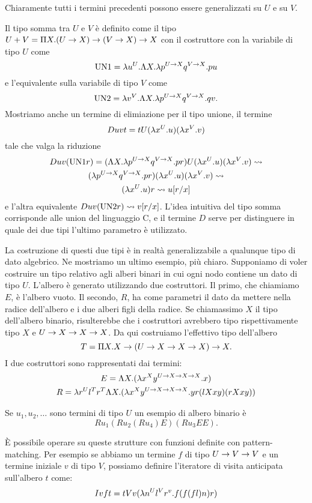 \documentclass[]{marticle}
\begin{document}
Chiaramente tutti i termini precedenti possono essere generalizzati su $U$ e su
$V$.

Il tipo somma tra $U$ e $V$ \`e definito come il tipo $U+V = \Pi X. (U\rightarrow X)
\rightarrow (V\rightarrow X) \rightarrow X$ con il costruttore con la variabile di tipo $U$ come 
\[
    \text{UN1} = \lambda u^U. \Lambda X. \lambda p^{U\rightarrow X} q^{V\rightarrow X}. pu
\]
e l'equivalente sulla variabile di tipo $V$ come 
\[
    \text{UN2} = \lambda v^V. \Lambda X. \lambda p^{U\rightarrow X} q^{V\rightarrow X}. qv.
\]
Mostriamo anche un termine di elimiazione per il tipo unione, il termine 
\[
    D uvt = tU (\lambda x^U.u)(\lambda x^V.v)
\]
tale che valga la riduzione
\begin{gather*}
    Duv(\text{UN1}r) = (\Lambda X. \lambda p^{U\rightarrow X}q^{V\rightarrow X}. pr) U (\lambda x^U.u)(\lambda
    x^V.v) \rightsquigarrow \\
    (\lambda p^{U\rightarrow X}q^{V\rightarrow X}. pr)(\lambda x^U.u)(\lambda x^V.v) \rightsquigarrow \\
    (\lambda x^U.u) r \rightsquigarrow u[r/x]
\end{gather*}
e l'altra equivalente $Duv(\text{UN2}r) \rightsquigarrow v[r/x]$.
L'idea intuitiva del tipo somma corrisponde alle union del linguaggio C, e il
termine $D$ serve per distinguere in quale dei due tipi l'ultimo parametro \`e
utilizzato.

La costruzione di questi due tipi \`e in realt\`a generalizzabile a qualunque
tipo di dato algebrico. Ne mostriamo un ultimo esempio, pi\`u chiaro. Supponiamo
di voler costruire un tipo relativo agli alberi binari in cui ogni nodo contiene
un dato di tipo $U$. L'albero \`e generato utilizzando due costruttori. Il
primo, che chiamiamo $E$, \`e l'albero vuoto. Il secondo, $R$, ha come parametri
il dato da mettere nella radice dell'albero e i due alberi figli della radice.
Se chiamassimo $X$ il tipo dell'albero binario, risulterebbe che i costruttori
avrebbero tipo rispettivamente tipo $X$ e $U \rightarrow X\rightarrow X \rightarrow X$. Da qui
costruiamo l'effettivo tipo dell'albero
\[
    T = \Pi X. X \rightarrow (U \rightarrow X \rightarrow X \rightarrow X) \rightarrow X.
\]
I due costruttori sono rappresentati dai termini:
\begin{gather*}
    E = \Lambda X. (\lambda x^X y^{U \rightarrow X \rightarrow X \rightarrow X}.x) \\
    R = \lambda r^U l^T r^T \Lambda X. (\lambda x^X y^{U \rightarrow X \rightarrow X \rightarrow X}.yr(lXxy)(rXxy))
\end{gather*}

Se $u_1, u_2,\dots$ sono termini di tipo $U$ un esempio di albero binario \`e 
\[
    Ru_1(Ru_2(Ru_4)E)(Ru_3EE).
\]

\`E possibile operare su queste strutture con funzioni definite con
pattern-matching. Per esempio se abbiamo un termine $f$ di tipo $U\rightarrow V\rightarrow V$
e un termine iniziale $v$ di tipo $V$, possiamo definire l'iteratore di visita
anticipata sull'albero $t$ come:
\[
    Ivft = tVv(\lambda n^U l^V r^v. f(f(fl)n)r)
\]
\end{document}
